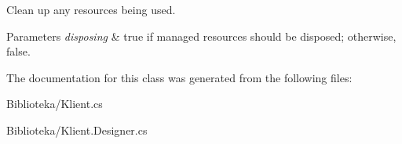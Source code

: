 Clean up any resources being used. 


\begin{DoxyParams}{Parameters}
{\em disposing} & true if managed resources should be disposed; otherwise, false.\\
\hline
\end{DoxyParams}


The documentation for this class was generated from the following files\+:\begin{DoxyCompactItemize}
\item 
Biblioteka/Klient.\+cs\item 
Biblioteka/Klient.\+Designer.\+cs\end{DoxyCompactItemize}
